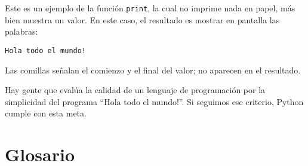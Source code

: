 Este es un ejemplo de la función  \texttt{print}, la cual no
imprime nada en papel, más bien muestra un valor. En este caso,
el resultado es mostrar en pantalla las palabras:

\beforeverb
\begin{verbatim}
Hola todo el mundo!
\end{verbatim}
\afterverb
%
Las comillas señalan el comienzo y el final del valor; no
aparecen en el resultado.


Hay gente que evalúa la calidad de un lenguaje de programación por
la simplicidad del programa ``Hola todo el mundo!''. Si seguimos
ese criterio, Python cumple con esta meta.

\section{Glosario}

